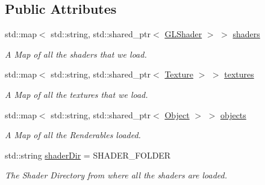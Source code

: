 \subsection*{Public Attributes}
\begin{DoxyCompactItemize}
\item 
\mbox{\label{classpiolot_1_1_asset_manager_ae8db7f8aa294e32d270181e4ba87d2ad}} 
std\+::map$<$ std\+::string, std\+::shared\+\_\+ptr$<$ \mbox{\hyperlink{classpiolot_1_1_g_l_shader}{G\+L\+Shader}} $>$ $>$ \mbox{\hyperlink{classpiolot_1_1_asset_manager_ae8db7f8aa294e32d270181e4ba87d2ad}{shaders}}
\begin{DoxyCompactList}\small\item\em A Map of all the shaders that we load. \end{DoxyCompactList}\item 
\mbox{\label{classpiolot_1_1_asset_manager_a6d9403a544a3efd67e33b52d6bb2a182}} 
std\+::map$<$ std\+::string, std\+::shared\+\_\+ptr$<$ \mbox{\hyperlink{classpiolot_1_1_texture}{Texture}} $>$ $>$ \mbox{\hyperlink{classpiolot_1_1_asset_manager_a6d9403a544a3efd67e33b52d6bb2a182}{textures}}
\begin{DoxyCompactList}\small\item\em A Map of all the textures that we load. \end{DoxyCompactList}\item 
\mbox{\label{classpiolot_1_1_asset_manager_a5051f83ff594361ac33d94a885afde10}} 
std\+::map$<$ std\+::string, std\+::shared\+\_\+ptr$<$ \mbox{\hyperlink{classpiolot_1_1_object}{Object}} $>$ $>$ \mbox{\hyperlink{classpiolot_1_1_asset_manager_a5051f83ff594361ac33d94a885afde10}{objects}}
\begin{DoxyCompactList}\small\item\em A Map of all the Renderables loaded. \end{DoxyCompactList}\item 
\mbox{\label{classpiolot_1_1_asset_manager_a0c7c10a24343176f2de6aeb2ddf1ac0d}} 
std\+::string \mbox{\hyperlink{classpiolot_1_1_asset_manager_a0c7c10a24343176f2de6aeb2ddf1ac0d}{shader\+Dir}} = S\+H\+A\+D\+E\+R\+\_\+\+F\+O\+L\+D\+ER
\begin{DoxyCompactList}\small\item\em The Shader Directory from where all the shaders are loaded. \end{DoxyCompactList}\item 

\end{DoxyCompactItemize}
